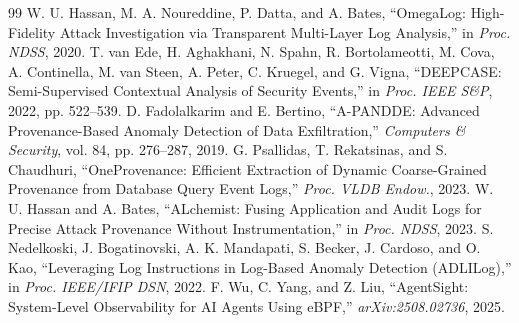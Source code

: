 \documentclass[conference]{IEEEtran}
\begin{document}
\begin{thebibliography}{99}
 W. U. Hassan, M. A. Noureddine, P. Datta, and A. Bates, ``OmegaLog: High-Fidelity Attack Investigation via Transparent Multi-Layer Log Analysis,'' in \emph{Proc. NDSS}, 2020.
 T. van Ede, H. Aghakhani, N. Spahn, R. Bortolameotti, M. Cova, A. Continella, M. van Steen, A. Peter, C. Kruegel, and G. Vigna, ``DEEPCASE: Semi-Supervised Contextual Analysis of Security Events,'' in \emph{Proc. IEEE S\&P}, 2022, pp. 522--539.
 D. Fadolalkarim and E. Bertino, ``A-PANDDE: Advanced Provenance-Based Anomaly Detection of Data Exfiltration,'' \emph{Computers \& Security}, vol. 84, pp. 276--287, 2019.
 G. Psallidas, T. Rekatsinas, and S. Chaudhuri, ``OneProvenance: Efficient Extraction of Dynamic Coarse-Grained Provenance from Database Query Event Logs,'' \emph{Proc. VLDB Endow.}, 2023.
 W. U. Hassan and A. Bates, ``ALchemist: Fusing Application and Audit Logs for Precise Attack Provenance Without Instrumentation,'' in \emph{Proc. NDSS}, 2023.
 S. Nedelkoski, J. Bogatinovski, A. K. Mandapati, S. Becker, J. Cardoso, and O. Kao, ``Leveraging Log Instructions in Log-Based Anomaly Detection (ADLILog),'' in \emph{Proc. IEEE/IFIP DSN}, 2022.
 F. Wu, C. Yang, and Z. Liu, ``AgentSight: System-Level Observability for AI Agents Using eBPF,'' \emph{arXiv:2508.02736}, 2025.


\end{thebibliography}
\end{document}
